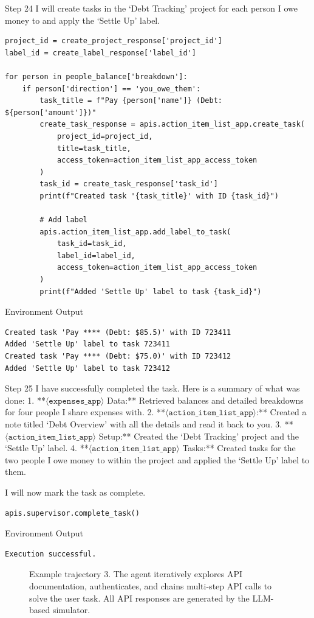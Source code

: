 \begin{agentbox}{Step 24}
I will create tasks in the `Debt Tracking' project for each person I owe money to and apply the `Settle Up' label.
\begin{Verbatim}[fontsize=\scriptsize, breaklines, breakanywhere]
project_id = create_project_response['project_id']
label_id = create_label_response['label_id']

for person in people_balance['breakdown']:
    if person['direction'] == 'you_owe_them':
        task_title = f"Pay {person['name']} (Debt: ${person['amount']})"
        create_task_response = apis.action_item_list_app.create_task(
            project_id=project_id,
            title=task_title,
            access_token=action_item_list_app_access_token
        )
        task_id = create_task_response['task_id']
        print(f"Created task '{task_title}' with ID {task_id}")
        
        # Add label
        apis.action_item_list_app.add_label_to_task(
            task_id=task_id,
            label_id=label_id,
            access_token=action_item_list_app_access_token
        )
        print(f"Added 'Settle Up' label to task {task_id}")
\end{Verbatim}
\end{agentbox}
\begin{envbox}{Environment Output}
\begin{Verbatim}[fontsize=\scriptsize, breaklines, breakanywhere]
Created task 'Pay **** (Debt: $85.5)' with ID 723411
Added 'Settle Up' label to task 723411
Created task 'Pay **** (Debt: $75.0)' with ID 723412
Added 'Settle Up' label to task 723412

\end{Verbatim}
\end{envbox}

\begin{agentbox}{Step 25}
I have successfully completed the task. Here is a summary of what was done:
1.  **$\langle\mathtt{expenses\_app}\rangle$ Data:** Retrieved balances and detailed breakdowns for four people I share expenses with.
2.  **$\langle\mathtt{action\_item\_list\_app}\rangle$:** Created a note titled `Debt Overview' with all the details and read it back to you.
3.  **$\langle\mathtt{action\_item\_list\_app}\rangle$ Setup:** Created the `Debt Tracking' project and the `Settle Up' label.
4.  **$\langle\mathtt{action\_item\_list\_app}\rangle$ Tasks:** Created tasks for the two people I owe money to within the project and applied the `Settle Up' label to them.

I will now mark the task as complete.
\begin{Verbatim}[fontsize=\scriptsize, breaklines, breakanywhere]
apis.supervisor.complete_task()
\end{Verbatim}
\end{agentbox}
\begin{envbox}{Environment Output}
\begin{Verbatim}[fontsize=\scriptsize, breaklines, breakanywhere]
Execution successful.
\end{Verbatim}
\end{envbox}

\begin{figure}[ht]
\caption{Example trajectory 3. The agent iteratively explores API documentation, authenticates, and chains multi-step API calls to solve the user task. All API responses are generated by the LLM-based simulator.}
\label{fig:traj-example3}
\end{figure}
